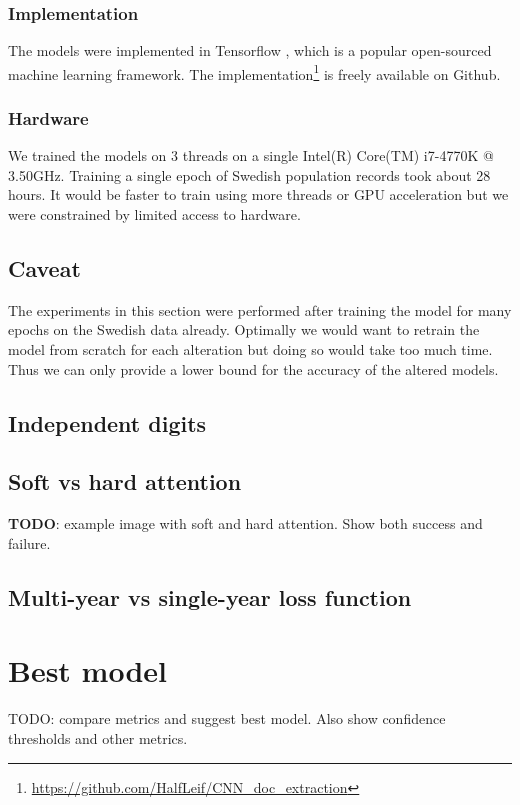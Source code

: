 \subsubsection{Implementation}
The models were implemented in Tensorflow \cite{Tensorflow}, which is a popular open-sourced machine learning framework. The implementation\footnote{\url{https://github.com/HalfLeif/CNN_doc_extraction}} is freely available on Github.

\subsubsection{Hardware}
We trained the models on 3 threads on a single Intel(R) Core(TM) i7-4770K @ 3.50GHz. Training a single epoch of Swedish population records took about 28 hours. It would be faster to train using more threads or GPU acceleration but we were constrained by limited access to hardware.


\subsection{Caveat}
The experiments in this section were performed after training the model for many epochs on the Swedish data already. Optimally we would want to retrain the model from scratch for each alteration but doing so would take too much time. Thus we can only provide a lower bound for the accuracy of the altered models.


\subsection{Independent digits} \label{sssec:ind_digits}

\subsection{Soft vs hard attention}

\textbf{TODO}: example image with soft and hard attention. Show both success and failure.

\subsection{Multi-year vs single-year loss function}


\section{Best model}

TODO: compare metrics and suggest best model. Also show confidence thresholds and other metrics.
